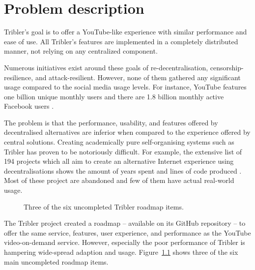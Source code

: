 \chapter{Problem description}
\label{chp:problem-description}

Tribler's goal is to offer a YouTube-like experience with similar performance and ease of use.
All Tribler's features are implemented in a completely distributed manner, not relying on any centralized component.

Numerous initiatives exist around these goals of re-decentralisation, censorship-resilience, and attack-resilient.
However, none of them gathered any significant usage compared to the social media usage levels. 
For instance, YouTube features one billion unique monthly users \cite{mainka2014government} and there are 1.8 billion monthly active Facebook users \cite{sharma2016strategies}.

The problem is that the performance, usability, and features offered by decentralised alternatives are inferior when compared to the experience offered by central solutions.
Creating academically pure self-organising systems such as Tribler has proven to be notoriously difficult.
For example, the extensive list of 194 projects which all aim to create an alternative Internet experience using decentralisations shows the amount of years spent and lines of code produced \cite{redecentralize2016alternative}.
Most of these project are abandoned and few of them have actual real-world usage.

\begin{figure}[!h]
	\caption{Three of the six uncompleted Tribler roadmap items.}
	\label{fig:tribler_roadmap}
\end{figure}

The Tribler project created a roadmap -- available on its GitHub repository -- to offer the same service, features, user experience, and performance as the YouTube video-on-demand service.
However, especially the poor performance of Tribler is hampering wide-spread adaption and usage. Figure~\ref{fig:tribler_roadmap} shows three of the six main uncompleted roadmap items.

